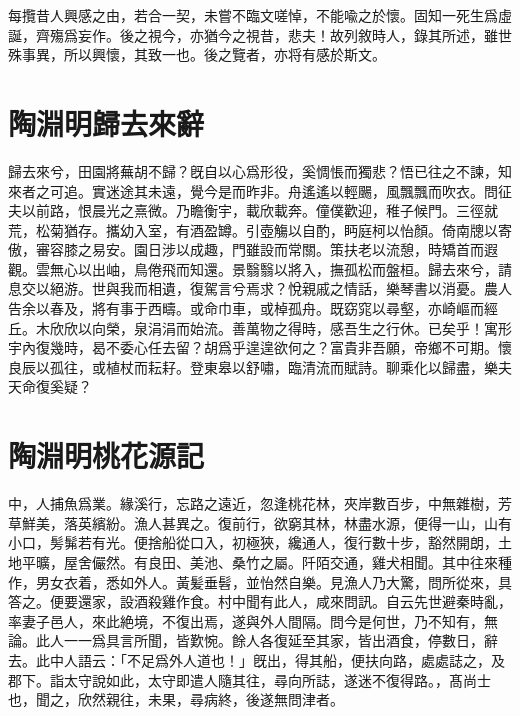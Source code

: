 每攬昔人興感之由，若合一契，未嘗不臨文嗟悼，不能喩之於懷。固知一死生爲虛誕，齊殤爲妄作。後之視今，亦猶今之視昔，悲夫！故列敘時人，錄其所述，雖世殊事異，所以興懷，其致一也。後之覽者，亦将有感於斯文。

\theendnotes

\section[歸去來辭\quad{\small 陶淵明}]{{\normalsize 陶淵明}\quad 歸去來辭}
歸去來兮，田園將蕪胡不歸？旣自以心爲形役，奚惆悵而獨悲？悟已往之不諫，知來者之可追。實迷途其未遠，覺今是而昨非。舟遙遙以輕颺，風飄飄而吹衣。問征夫以前路，恨晨光之熹微。乃瞻衡宇，載欣載奔。僮僕歡迎，稚子候門。三徑就荒，松菊猶存。攜幼入室，有酒盈罇。引壺觴以自酌，眄庭柯以怡顏。倚南牕以寄傲，審容膝之易安。園日涉以成趣，門雖設而常關。策扶老以流憩，時矯首而遐觀。雲無心以出岫，鳥倦飛而知還。景翳翳以將入，撫孤松而盤桓。歸去來兮，請息交以絕游。世與我而相遺，復駕言兮焉求？悅親戚之情話，樂琴書以消憂。農人告余以春及，將有事于西疇。或命巾車，或棹孤舟。既窈窕以尋壑，亦崎嶇而經丘。木欣欣以向榮，泉涓涓而始流。善萬物之得時，感吾生之行休。已矣乎！寓形宇內復幾時，曷不委心任去留？胡爲乎遑遑欲何之？富貴非吾願，帝鄉不可期。懷良辰以孤往，或植杖而耘耔。登東皋以舒嘯，臨清流而賦詩。聊乘化以歸盡，樂夫天命復奚疑？ 

\theendnotes

\section[桃花源記\quad{\small 陶淵明}]{{\normalsize 陶淵明}\quad 桃花源記}
中，人捕魚爲業。緣溪行，忘路之遠近，忽逢桃花林，夾岸數百步，中無雜樹，芳草鮮美，落英繽紛。漁人甚異之。復前行，欲窮其林，林盡水源，便得一山，山有小口，髣髴若有光。便捨船從口入，初極狹，纔通人，復行數十步，豁然開朗，土地平曠，屋舍儼然。有良田、美池、桑竹之屬。阡陌交通，雞犬相聞。其中往來種作，男女衣着，悉如外人。黃髪垂髫，並怡然自樂。見漁人乃大驚，問所從來，具答之。便要還家，設酒殺雞作食。村中聞有此人，咸來問訊。自云先世避秦時亂，率妻子邑人，來此絶境，不復出焉，遂與外人間隔。問今是何世，乃不知有，無論。此人一一爲具言所聞，皆歎惋。餘人各復延至其家，皆出酒食，停數日，辭去。此中人語云：「不足爲外人道也！」旣出，得其船，便扶向路，處處誌之，及郡下。詣太守說如此，太守即遣人隨其往，尋向所誌，遂迷不復得路。，髙尚士也，聞之，欣然親往，未果，尋病終，後遂無問津者。

